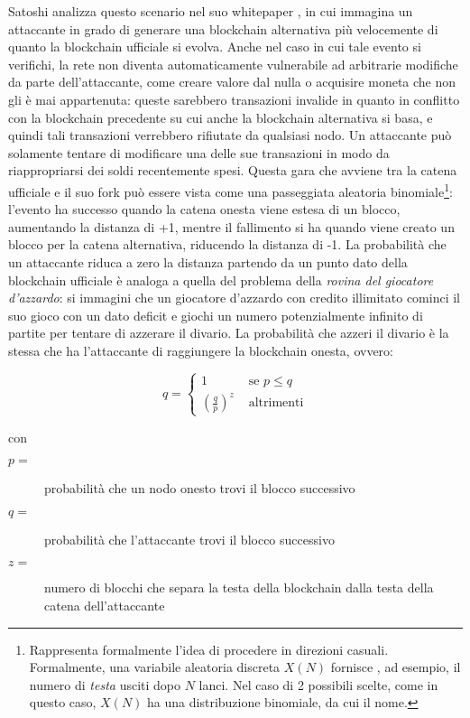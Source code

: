 Satoshi analizza questo scenario nel suo whitepaper \cite{bitcoin}, in cui immagina un attaccante in grado di generare una blockchain alternativa più velocemente di quanto la blockchain ufficiale si evolva.
Anche nel caso in cui tale evento si verifichi, la rete non diventa automaticamente vulnerabile ad arbitrarie modifiche da parte dell'attaccante, come creare valore dal nulla o acquisire moneta che non gli è mai appartenuta: queste sarebbero transazioni invalide in quanto in conflitto con la blockchain precedente su cui anche la blockchain alternativa si basa, e quindi tali transazioni verrebbero rifiutate da qualsiasi nodo. Un attaccante può solamente tentare di modificare una delle sue transazioni in modo da riappropriarsi dei soldi recentemente spesi.
Questa gara che avviene tra la catena ufficiale e il suo fork può essere vista come una passeggiata aleatoria binomiale\footnote{Rappresenta formalmente l'idea di procedere in direzioni casuali. Formalmente, una variabile aleatoria discreta $X(N)$ fornisce , ad esempio, il numero di \emph{testa} usciti dopo $N$ lanci. Nel caso di 2 possibili scelte, come in questo caso, $X(N)$ ha una distribuzione binomiale, da cui il nome.}: l'evento ha successo quando la catena onesta viene estesa di un blocco, aumentando la distanza di +1, mentre il fallimento si ha quando viene creato un blocco per la catena alternativa, riducendo la distanza di -1.
La probabilità che un attaccante riduca a zero la distanza partendo da un punto dato della blockchain ufficiale è analoga a quella del problema della \emph{rovina del giocatore d'azzardo}: si immagini che un giocatore d'azzardo con credito illimitato cominci il suo gioco con un dato deficit e giochi un numero potenzialmente infinito di partite per tentare di azzerare il divario.
La probabilità che azzeri il divario è la stessa che ha l'attaccante di raggiungere la blockchain onesta, ovvero:

\[
q = \begin{cases}
1 & \text{ se } p \leq q \\
\left( \frac{q}{p} \right)^z & \text{ altrimenti}
\end{cases}
\]

con

\begin{description}
\item[$p = $] probabilità che un nodo onesto trovi il blocco successivo
\item[$q = $] probabilità che l'attaccante trovi il blocco successivo
\item[$z = $] numero di blocchi che separa la testa della blockchain dalla testa della catena dell'attaccante
\end{description}

